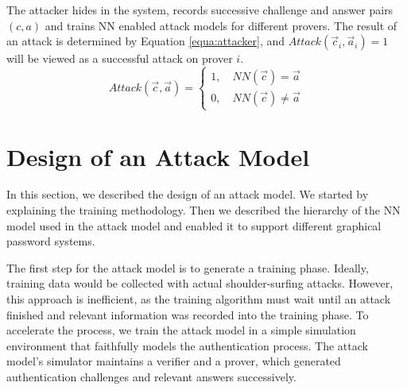 \documentclass{article}
\begin{document}
  The attacker hides in the system, records successive challenge and answer pairs $(c, a)$ and trains 
  NN enabled attack models for different provers. The result of an attack is determined by Equation \ref{equa:attacker}, 
  and $Attack(\vec{c}_i,\vec{a}_i)=1$ will be viewed as a successful attack on prover $i$.
  \begin{equation}
    Attack(\vec{c}, \vec{a})=
  \left\{
   \begin{aligned}
   1, \quad NN(\vec{c}) = \vec{a} \\
   0, \quad NN(\vec{c}) \neq \vec{a}
   \end{aligned}
   \right.
  \label{equa:attacker}
  \end{equation}
  
  
  \section{Design of an Attack Model}
  \label{sec:design}
  In this section, we described the design of an attack model. We started by explaining the training 
  methodology. Then we described the hierarchy of the NN model used in the attack model and enabled it 
  to support different graphical password systems.
  
  The first step for the attack model is to generate a training phase. Ideally, training data would be collected with actual 
  shoulder-surfing attacks. However, this approach is inefficient, as the training algorithm must wait until an attack 
  finished and relevant information was recorded into the training phase. To accelerate the process, we train 
  the attack model in a simple simulation environment that faithfully models the authentication process. The 
  attack model's simulator maintains a verifier and a prover, which generated authentication challenges and 
  relevant answers successively.
  
\end{document}
